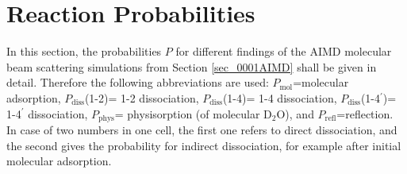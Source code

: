 \documentclass[11pt,DIV=13,BCOR=5mm,a4paper,headinclude]{scrbook}
\newcommand\todo[1]{\textcolor{red}{TODO: \textit{{#1}}}}
\begin{document}
% 
% 
% 
% 
% 
% 
% 
% 
 \def\thefigure{C.\arabic{figure}}
 \def\thetable{C.\arabic{table}}
\section{Reaction Probabilities}\label{reactionprobabilities}
In this section, the probabilities $P$ for different findings of the AIMD molecular beam scattering simulations from Section \ref{sec_0001AIMD} shall be given in detail.
Therefore the following abbreviations are used: $P_\textrm{mol}$=molecular adsorption, 
 $P_\textrm{diss}$(1-2)= 1-2 dissociation, $P_\textrm{diss}$(1-4)= 1-4 dissociation, $P_\textrm{diss}$(1-4$^\prime$)= 1-4$^\prime$ dissociation, $P_\textrm{phys}$= physisorption (of molecular D$_2$O), and $P_\textrm{refl}$=reflection.
In case of two numbers in one cell, the first one refers to direct dissociation, and the second gives the probability for indirect dissociation, for example after initial molecular adsorption.
\end{document}
